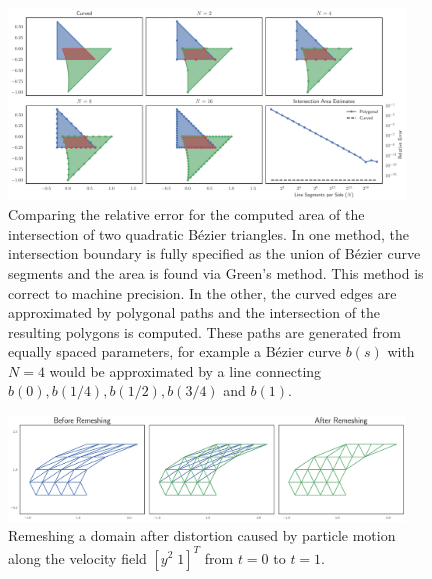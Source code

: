 \begin{figure}
  \includegraphics[width=0.9375\textwidth]
                  {../images/curved-mesh/polygon_vs_curved_intersection.pdf}
  \centering
  \caption{Comparing the relative error for the computed area of the
    intersection of two quadratic B\'{e}zier triangles. In one method, the
    intersection boundary is fully specified as the union of B\'{e}zier curve
    segments and the area is found via Green's method. This method is correct
    to machine precision. In the other, the curved edges are approximated by
    polygonal paths and the intersection of the resulting polygons is computed.
    These paths are generated from equally spaced parameters, for example a
    B\'{e}zier curve \(b(s)\) with \(N = 4\) would be approximated by a line
    connecting \(b(0), b(1/4), b(1/2), b(3/4)\) and \(b(1)\).}
  \label{fig:polygon-vs-curved-intersection}
\end{figure}

\begin{figure}
  \includegraphics[width=0.9375\textwidth]
                  {../images/curved-mesh/distortion_remesh.pdf}
  \centering
  \caption{Remeshing a domain after distortion caused by particle motion
    along the velocity field \(\left[ y^2 \; 1 \right]^T\) from \(t = 0\)
    to \(t = 1\).}
  \label{fig:distortion-remesh}
\end{figure}
